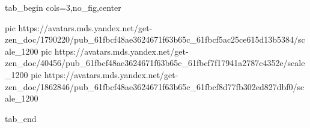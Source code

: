  
 
 
 
 


\ifcmt
  tab_begin cols=3,no_fig,center

		 pic https://avatars.mds.yandex.net/get-zen_doc/1790220/pub_61fbcf48ae3624671f63b65c_61fbcf5ac25ce615d13b5384/scale_1200
     pic https://avatars.mds.yandex.net/get-zen_doc/40456/pub_61fbcf48ae3624671f63b65c_61fbcf7f17941a2787c4352e/scale_1200
		 pic https://avatars.mds.yandex.net/get-zen_doc/1862846/pub_61fbcf48ae3624671f63b65c_61fbcf8d77fb302ed827dbf0/scale_1200

  tab_end
\fi
